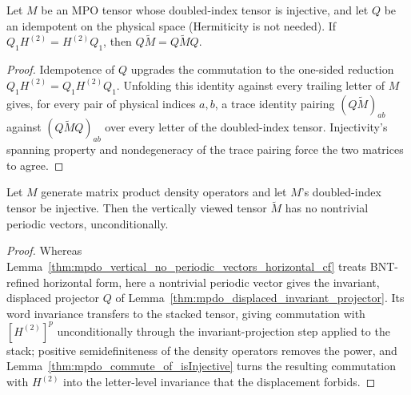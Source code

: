 \begin{lemma}
    \label{thm:mpdo_commute_of_isInjective}
    \leanok
    Let $M$ be an MPO tensor whose doubled-index tensor is injective, and
    let $Q$ be an idempotent on the physical space (Hermiticity is not
    needed). If $Q_1H^{(2)}=H^{(2)}Q_1$, then
    $Q\widetilde M=Q\widetilde MQ$.
\end{lemma}

\begin{proof}
    \leanok
    Idempotence of $Q$ upgrades the commutation to the one-sided reduction
    $Q_1H^{(2)}=Q_1H^{(2)}Q_1$. Unfolding this identity against every
    trailing letter of $M$ gives, for every pair of physical indices $a,b$,
    a trace identity pairing $(Q\widetilde M)_{ab}$ against
    $(Q\widetilde MQ)_{ab}$ over every letter of the doubled-index tensor.
    Injectivity's spanning property and nondegeneracy of the trace pairing
    force the two matrices to agree.
\end{proof}

\begin{lemma}
    \label{thm:mpdo_vertical_no_periodic_vectors_injective}
    \leanok
    Let $M$ generate matrix product density operators and let $M$'s
    doubled-index tensor be injective. Then the vertically viewed tensor
    $\widetilde M$ has no nontrivial periodic vectors, unconditionally.
\end{lemma}

\begin{proof}
    \leanok
    Whereas Lemma~\ref{thm:mpdo_vertical_no_periodic_vectors_horizontal_cf}
    treats BNT-refined horizontal form, here a nontrivial periodic
    vector gives the invariant, displaced projector $Q$ of
    Lemma~\ref{thm:mpdo_displaced_invariant_projector}. Its word
    invariance transfers to the stacked tensor, giving commutation with
    $[H^{(2)}]^p$ unconditionally through the invariant-projection step
    applied to the stack; positive semidefiniteness of the density operators
    removes the power, and Lemma~\ref{thm:mpdo_commute_of_isInjective}
    turns the resulting commutation with $H^{(2)}$ into the letter-level
    invariance that the displacement forbids.
\end{proof}
